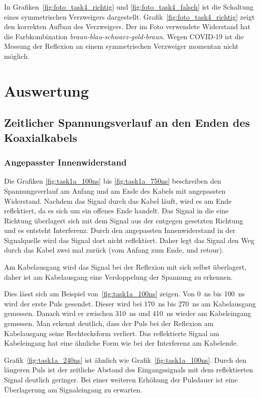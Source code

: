 \documentclass{article}
\begin{document}
In Grafiken~\ref{fig:foto_task4_richtig} und \ref{fig:foto_task4_falsch} ist die Schaltung eines symmetrischen Verzweigers dargestellt. Grafik~\ref{fig:foto_task4_richtig} zeigt den korrekten Aufbau des Verzweigers. Der im Foto verwendete Widerstand hat die Farbkombination \textit{braun-blau-schwarz-gold-braun}. Wegen COVID-19 ist die Messung der Reflexion an einem symmetrischen Verzweiger momentan nicht möglich.


\section{Auswertung}

\subsection{Zeitlicher Spannungsverlauf an den Enden des Koaxialkabels}

\subsubsection{Angepasster Innenwiderstand}
Die Grafiken \ref{fig:task1a_100ns} bis \ref{fig:task1a_750ns} beschreiben den Spannungsverlauf am Anfang und am Ende des Kabels mit angepassten Widerstand. Nachdem das Signal durch das Kabel läuft, wird es am Ende reflektiert, da es sich um ein offenes Ende handelt. Das Signal in die eine Richtung überlagert sich mit dem Signal aus der entgegen gesetzten Richtung und es entsteht Interferenz. Durch den angepassten Innenwiderstand in der Signalquelle wird das Signal dort nicht reflektiert. Daher legt das Signal den Weg durch das Kabel zwei mal zurück (vom Anfang zum Ende, und retour).

Am Kabelausgang wird das Signal bei der Reflexion mit sich selbst überlagert, daher ist am Kabelausgang eine Verdoppelung der Spannung zu erkennen.

Dies lässt sich am Beispiel von~\ref{fig:task1a_100ns} zeigen. Von 0~ns bis 100~ns wird der erste Puls gesendet. Dieser wird bei 170~ns bis 270~ns am Kabelausgang gemessen. Danach wird er zwischen 310~ns und 410~ns wieder am Kabeleingang gemessen. Man erkennt deutlich, dass der Puls bei der Reflexion am Kabelausgang seine Rechtecksform verliert. Das reflektierte Signal am Kabeleingang hat eine ähnliche Form wie bei der Interferenz am Kabelende.


Grafik~\ref{fig:task1a_240ns} ist ähnlich wie Grafik~\ref{fig:task1a_100ns}. Durch den längeren Puls ist der zeitliche Abstand des Eingangssignals mit dem reflektierten Signal deutlich geringer. Bei einer weiteren Erhöhung der Pulsdauer ist eine Überlagerung am Signaleingang zu erwarten.
\end{document}
